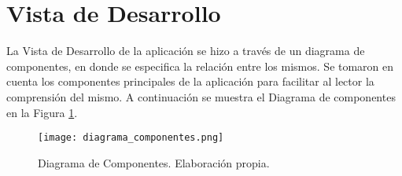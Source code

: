 
\pagebreak
\section{Vista de Desarrollo} \label{vistaImplementacion}
La Vista de Desarrollo de la aplicación se hizo a través de un diagrama de componentes, en donde se especifica la relación entre los mismos. Se tomaron en cuenta los componentes principales de la aplicación para facilitar al lector la comprensión del mismo.
A continuación se muestra el Diagrama de componentes en la Figura \ref{fig:diagrama_componentes}.

\begin{figure}[H]
   \texttt{[image: diagrama\_componentes.png]}
   \caption{Diagrama de Componentes. Elaboración propia.}
   \label{fig:diagrama_componentes}
   \centering
\end{figure}